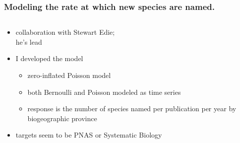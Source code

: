 \documentclass{beamer}
\begin{document}
\begin{frame}
  \frametitle{Modeling the rate at which new species are named.}
  \begin{columns}
    \begin{column}{0.5\textwidth}
      \begin{itemize}
        \item collaboration with Stewart Edie;\\ he's lead
        \item I developed the model
          \begin{itemize}
            \item zero-inflated Poisson model 
            \item both Bernoulli and Poisson modeled as time series
            \item response is the number of species named per publication per year by biogeographic province
          \end{itemize}
        \item targets seem to be PNAS or Systematic Biology
      \end{itemize}
    \end{column}
    \begin{column}{0.5\textwidth}
      \begin{center}

\end{center}
\end{column}
\end{columns}
\end{frame}
\end{document}
